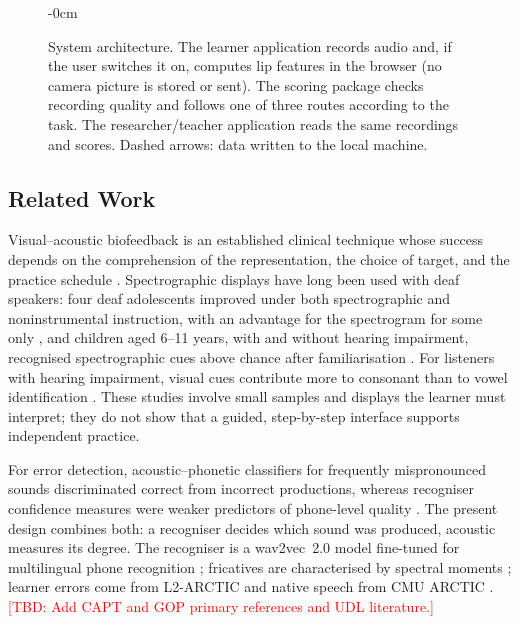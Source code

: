 \documentclass[engproc,article,submit,moreauthors]{Definitions/mdpi}
\newcommand{\tbd}[1]{\textcolor{red}{[TBD: #1]}}
\begin{document}
\begin{figure}[!t]
\begin{adjustwidth}{-\extralength}{0cm}
{}
\end{adjustwidth}
\caption{System architecture. The learner application records audio and, if the user switches it on, computes lip features in the browser (no camera picture is stored or sent). The scoring package checks recording quality and follows one of three routes according to the task. The researcher/teacher application reads the same recordings and scores. Dashed arrows: data written to the local machine.}
\label{fig:arch}
\end{figure}

\subsection{Related Work}
Visual--acoustic biofeedback is an established clinical technique whose success depends on the comprehension of the representation, the choice of target, and the practice schedule \cite{hitchcock2023}. Spectrographic displays have long been used with deaf speakers: four deaf adolescents improved under both spectrographic and noninstrumental instruction, with an advantage for the spectrogram for some only \cite{ertmermaki2000}, and children aged 6--11 years, with and without hearing impairment, recognised spectrographic cues above chance after familiarisation \cite{ertmer2004}. For listeners with hearing impairment, visual cues contribute more to consonant than to vowel identification \cite{moradi2017,desai2008}. These studies involve small samples and displays the learner must interpret; they do not show that a guided, step-by-step interface supports independent practice.

For error detection, acoustic--phonetic classifiers for frequently mispronounced sounds discriminated correct from incorrect productions, whereas recogniser confidence measures were weaker predictors of phone-level quality \cite{truong2005}. The present design combines both: a recogniser decides which sound was produced, acoustic measures its degree. The recogniser is a wav2vec~2.0 model \cite{baevski2020} fine-tuned for multilingual phone recognition \cite{xu2022}; fricatives are characterised by spectral moments \cite{jongman2000}; learner errors come from L2-ARCTIC \cite{zhao2018} and native speech from CMU ARCTIC \cite{kominek2004}. \tbd{Add CAPT and GOP primary references and UDL literature.}
\end{document}
